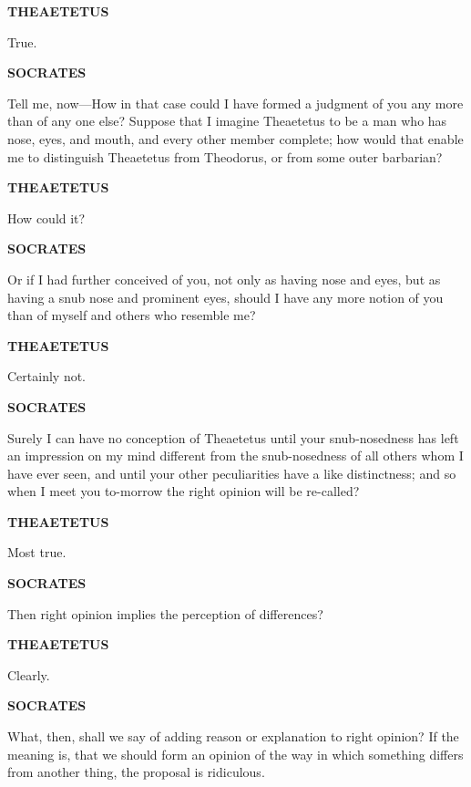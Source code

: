 \documentclass[11pt,letter]{article}
\begin{document}
\par \textbf{THEAETETUS}
\par   True.

\par \textbf{SOCRATES}
\par   Tell me, now—How in that case could I have formed a judgment of you any more than of any one else? Suppose that I imagine Theaetetus to be a man who has nose, eyes, and mouth, and every other member complete; how would that enable me to distinguish Theaetetus from Theodorus, or from some outer barbarian?

\par \textbf{THEAETETUS}
\par   How could it?

\par \textbf{SOCRATES}
\par   Or if I had further conceived of you, not only as having nose and eyes, but as having a snub nose and prominent eyes, should I have any more notion of you than of myself and others who resemble me?

\par \textbf{THEAETETUS}
\par   Certainly not.

\par \textbf{SOCRATES}
\par   Surely I can have no conception of Theaetetus until your snub-nosedness has left an impression on my mind different from the snub-nosedness of all others whom I have ever seen, and until your other peculiarities have a like distinctness; and so when I meet you to-morrow the right opinion will be re-called?

\par \textbf{THEAETETUS}
\par   Most true.

\par \textbf{SOCRATES}
\par   Then right opinion implies the perception of differences?

\par \textbf{THEAETETUS}
\par   Clearly.

\par \textbf{SOCRATES}
\par   What, then, shall we say of adding reason or explanation to right opinion? If the meaning is, that we should form an opinion of the way in which something differs from another thing, the proposal is ridiculous.
\end{document}

